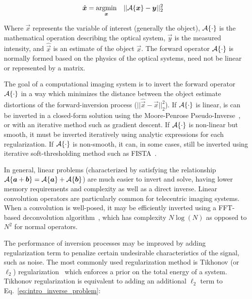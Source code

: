 \begin{equation}\label{eq:intro_inverse_problem}
\begin{aligned}
& \hat{\bm{x}} = \underset{\bm{\bm{x}}}{\text{argmin}}
& & ||\mathcal{A}\{\bm{x}\} - \bm{y} ||_2^2
\end{aligned}
\end{equation}

Where $\vec{x}$ represents the variable of interest (generally the object), $\mathcal{A}\{\cdot\}$ is the mathematical operation describing the optical system, $\vec{y}$ is the measured intensity, and $\hat{\vec{x}}$ is an estimate of the object $\vec{x}$. The forward operator $\mathcal{A}\{\cdot\}$ is normally formed based on the physics of the optical systems, need not be linear or represented by a matrix.

The goal of a computational imaging system is to invert the forward operator $\mathcal{A}\{\cdot\}$ in a way which minimizes the distance between the object estimate distortions of the forward-inversion process ($||\hat{\vec{x}} - \vec{x}||_2^2$). If $\mathcal{A}\{\cdot\}$ is linear, is can be inverted in a closed-form solution using the Moore-Penrose Pseudo-Inverse~\cite{moore1920reciprocal}, or with an iterative method such as gradient descent. If $\mathcal{A}\{\cdot\}$ is non-linear but smooth, it must be inverted iteratively using analytic expressions for each regularization. If $\mathcal{A}\{\cdot\}$ is non-smooth, it can, in some cases, still be inverted using iterative soft-thresholding method such as FISTA~\cite{beck2009fast}.

In general, linear problems (characterized by satisfying the relationship $\mathcal{A}\{\bm{a} + \bm{b}\} = \mathcal{A}\{\bm{a}\} + \mathcal{A}\{\bm{b}\} $) are much easier to invert and solve, having lower memory requirements and complexity as well as a direct inverse. Linear convolution operators are particularly common for telecentric imaging systems. When a convolution is well-posed, it may be efficiently inverted using a FFT-based deconvolution algorithm~\cite{cooley1965algorithm}, which has complexity $N \log(N)$ as opposed to $N^2$ for normal operators.

The performance of inversion processes may be improved by adding regularization term to penalize certain undesirable characteristics of the signal, such as noise. The most commonly used regularization method is Tikhonov (or $\ell_2$) regularization~\cite{tikhonov1943stability} which enforces a prior on the total energy of a system. Tikhonov regularization is equivalent to adding an additional $\ell_2$ term to Eq.~\ref{eq:intro_inverse_problem}:

